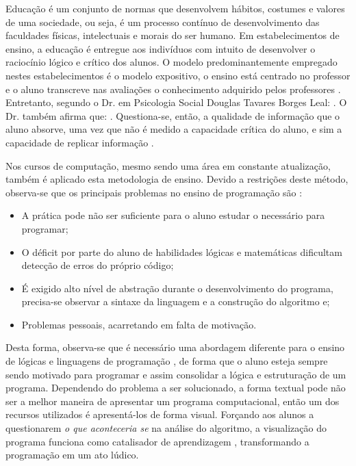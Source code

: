 Educação é um conjunto de normas que desenvolvem hábitos, costumes e valores de uma sociedade, ou seja, é um processo contínuo de desenvolvimento das faculdades físicas, intelectuais e morais do ser humano. Em estabelecimentos de ensino, a educação é entregue aos indivíduos com intuito de desenvolver o raciocínio lógico e crítico dos alunos. O modelo predominantemente empregado nestes estabelecimentos é o modelo expositivo, o ensino está centrado no professor e o aluno transcreve nas avaliações o conhecimento adquirido pelos professores \cite{educacao}. Entretanto, segundo o Dr. em Psicologia Social Douglas Tavares Borges Leal: 
.
O Dr. também afirma que: 
.
Questiona-se, então, a qualidade de informação que o aluno absorve, uma vez que não é medido a capacidade crítica do aluno, e sim a capacidade de replicar informação \cite{expositivo}. 

Nos cursos de computação, mesmo sendo uma área em constante atualização, também é aplicado esta metodologia de ensino. Devido a restrições deste método, observa-se que os principais problemas no ensino de programação são \cite{ludicoalgoritmo}:
\begin{itemize}
  \item A prática pode não ser suficiente para o aluno estudar o necessário para programar;
  \item O déficit por parte do aluno de habilidades lógicas e matemáticas dificultam detecção de erros do próprio código;
  \item É exigido alto nível de abstração durante o desenvolvimento do programa, precisa-se observar a sintaxe da linguagem e a construção do algoritmo e;
  \item Problemas pessoais, acarretando em falta de motivação.
\end{itemize}

Desta forma, observa-se que é necessário uma abordagem diferente para o ensino de lógicas e linguagens de programação \cite{ludicoalgoritmo}, de forma que o aluno esteja sempre sendo motivado para programar e assim consolidar a lógica e estruturação de um programa. Dependendo do problema a ser solucionado, a forma textual pode não ser a melhor maneira de apresentar um programa computacional, então um dos recursos utilizados é apresentá-los de forma visual. Forçando aos alunos a questionarem \emph{o que aconteceria se} na análise do algoritmo, a visualização do programa funciona como catalisador de aprendizagem \cite{problemaalgoritmo}, transformando a programação em um ato lúdico. 

